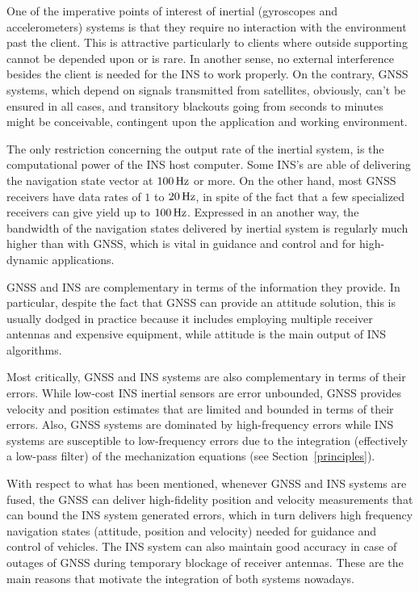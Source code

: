 \documentclass[journal]{IEEEtran}
\begin{document}
One of the imperative points of interest of inertial (gyroscopes and accelerometers) systems is that they require no interaction with the environment past the client. This is attractive  particularly to clients where outside supporting cannot be depended upon or is rare. In another sense, no external interference besides the client is needed for the INS to work properly. On the contrary, GNSS systems, which depend on signals transmitted from satellites, obviously, can't be ensured in all cases, and transitory blackouts going from seconds to minutes might be conceivable, contingent upon the application and working environment.

The only restriction concerning the output rate of the inertial system, is the computational power of the INS host computer. Some INS's are able of delivering the navigation state vector at $\unit[100]{Hz}$ or more. On the other hand, most GNSS receivers have data rates of $1$ to $\unit[20]{Hz}$, in spite of the fact that a few specialized receivers can give yield up to $\unit[100]{Hz}$. Expressed in an another way, the bandwidth of the navigation states delivered by inertial system is regularly much higher than with GNSS, which is vital in guidance and control and for high-dynamic applications.

GNSS and INS are complementary in terms of the information they provide. In particular, despite the fact that GNSS can provide an attitude solution, this is usually dodged in practice because it includes employing multiple receiver antennas and expensive equipment, while attitude is the main output of INS algorithms.

Most critically, GNSS and INS systems are also complementary in terms of their errors. While low-cost INS inertial sensors are error unbounded, GNSS provides velocity and position estimates that are limited and bounded in terms of their errors. Also, GNSS systems are dominated by high-frequency errors while INS systems are susceptible to low-frequency errors due to the integration (effectively a low-pass filter) of the mechanization equations (see Section~\ref{principles}).

With respect to what has been mentioned, whenever GNSS and INS systems are fused, the GNSS can deliver high-fidelity position and velocity measurements that can bound the INS system generated errors, which in turn delivers high frequency navigation states (attitude, position and velocity) needed for guidance and control of vehicles. The INS system can also maintain good accuracy in case of outages of GNSS during temporary blockage of receiver antennas. These are the main reasons that motivate the integration of both systems nowadays. 
\end{document}
